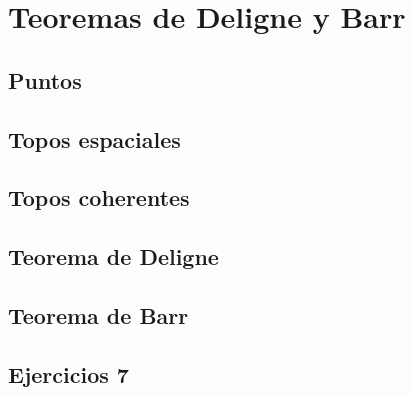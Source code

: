 \chapter{Teoremas de Deligne y Barr}
\label{cap:7}

\section{Puntos}
\label{sec:7.1}

\section{Topos espaciales}
\label{sec:7.2}

\section{Topos coherentes}
\label{sec:7.3}

\section{Teorema de Deligne}
\label{sec:7.4}

\section{Teorema de Barr}
\label{sec:7.5}

\section*{Ejercicios 7}
\label{sec:ejercicios-7}
